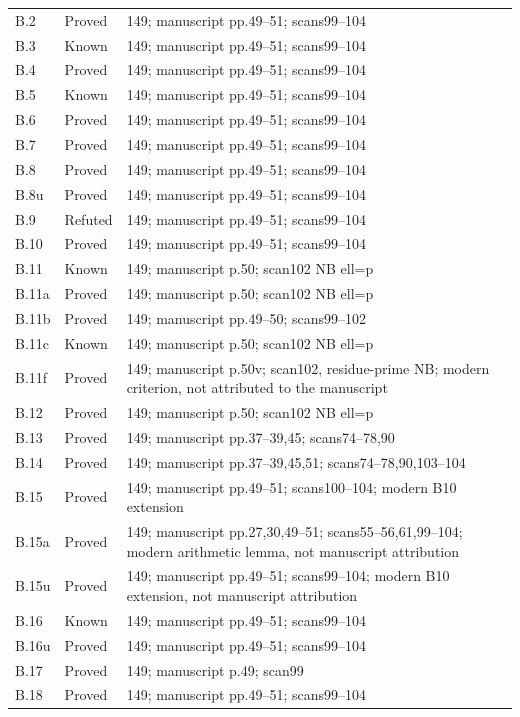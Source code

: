 {\begin{longtable}{p{1.9cm}p{1.7cm}p{10.3cm}}
B.2 & Proved & 149; manuscript pp.49–51; scans99–104 \\
B.3 & Known & 149; manuscript pp.49–51; scans99–104 \\
B.4 & Proved & 149; manuscript pp.49–51; scans99–104 \\
B.5 & Known & 149; manuscript pp.49–51; scans99–104 \\
B.6 & Proved & 149; manuscript pp.49–51; scans99–104 \\
B.7 & Proved & 149; manuscript pp.49–51; scans99–104 \\
B.8 & Proved & 149; manuscript pp.49–51; scans99–104 \\
B.8u & Proved & 149; manuscript pp.49–51; scans99–104 \\
B.9 & Refuted & 149; manuscript pp.49–51; scans99–104 \\
B.10 & Proved & 149; manuscript pp.49–51; scans99–104 \\
B.11 & Known & 149; manuscript p.50; scan102 NB ell=p \\
B.11a & Proved & 149; manuscript p.50; scan102 NB ell=p \\
B.11b & Proved & 149; manuscript pp.49–50; scans99–102 \\
B.11c & Known & 149; manuscript p.50; scan102 NB ell=p \\
B.11f & Proved & 149; manuscript p.50v; scan102, residue-prime NB; modern criterion, not attributed to the manuscript \\
B.12 & Proved & 149; manuscript p.50; scan102 NB ell=p \\
B.13 & Proved & 149; manuscript pp.37–39,45; scans74–78,90 \\
B.14 & Proved & 149; manuscript pp.37–39,45,51; scans74–78,90,103–104 \\
B.15 & Proved & 149; manuscript pp.49–51; scans100–104; modern B10 extension \\
B.15a & Proved & 149; manuscript pp.27,30,49–51; scans55–56,61,99–104; modern arithmetic lemma, not manuscript attribution \\
B.15u & Proved & 149; manuscript pp.49–51; scans99–104; modern B10 extension, not manuscript attribution \\
B.16 & Known & 149; manuscript pp.49–51; scans99–104 \\
B.16u & Proved & 149; manuscript pp.49–51; scans99–104 \\
B.17 & Proved & 149; manuscript p.49; scan99 \\
B.18 & Proved & 149; manuscript pp.49–51; scans99–104 \\

\end{longtable}}
